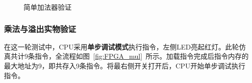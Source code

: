 \documentclass[lang=cn,a4paper,newtx]{elegantpaper}
\begin{document}
\begin{figure}[htbp]
  \centering
  \caption{简单加法器验证}
  \hspace{0.05\textwidth}
  \label{fig:FPGA_add}
\end{figure}

\subsubsection{乘法与溢出实物验证}

在这一轮测试中，CPU采用\textbf{单步调试模式}执行指令，左侧LED亮起红灯。此轮仿真共计9条指令，全流程如图~\ref{fig:FPGA_mul}~所示。加载指令完成后指令内存的最大地址为9，即共存入9条指令。将最右侧开关打开后，CPU开始单步调试执行指令。
\end{document}
